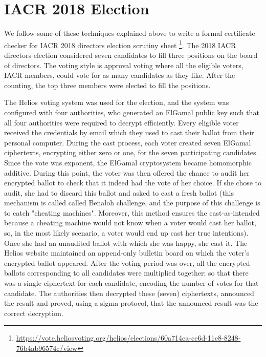 \section{IACR 2018 Election}
\label{sec:election_iacr}
We follow some of these techniques explained above to write a formal 
certificate checker for  IACR 2018 directors election scrutiny sheet
\footnote{\url{https://vote.heliosvoting.org/helios/elections/60a714ea-ce6d-11e8-8248-76b4ab96574c/view}}.  
The 2018  IACR directors election considered seven 
 candidates to fill three positions on the board of directors.   The voting 
 style is approval voting where all the eligible voters, IACR members, 
 could vote for as many candidates as they like. After the counting, 
 the top three members were elected to fill the positions. 
 
The Helios voting system \citep{Helios:2016:HVS}  was used for the election, and the system
was configured with four authorities, who generated an ElGamal \citep{elgamal1985public}  public
key such that all four authorities were required to decrypt efficiently.    
Every eligible voter received the credentials by email which they used 
to cast their ballot from their personal computer. 
During the cast process, each voter created seven ElGamal ciphertexts, 
encrypting either zero or one, for the seven participating candidates. 
Since the vote was exponent, the ElGamal cryptosystem became 
homomorphic additive.  During this point,  the voter was then offered the chance to audit 
her encrypted ballot to check that
it indeed had the vote of her choice. If she chose to audit,  she had to
discard this ballot and asked to cast 
a fresh ballot (this mechanism is called called Benaloh challenge, 
and the purpose of this challenge is to catch "cheating machines". 
Moreover, this method ensures the cast-as-intended because 
a cheating machine would not know when a voter would 
cast her ballot, so, in the most likely scenario, a voter would 
end up cast her true intentions).  Once she had an 
unaudited ballot with which she was happy,  she cast it. 
The Helios website maintained an append-only bulletin board on which the voter's
encrypted ballot appeared.  
After the voting period was over,
all the encrypted ballots corresponding to all candidates were multiplied together; so that there was 
a single ciphertext for each candidate, encoding the number of votes for
that candidate.  The authorities then decrypted 
these (seven) ciphertexts, announced the result and proved,
using a sigma protocol, that the announced result was the 
correct decryption.


